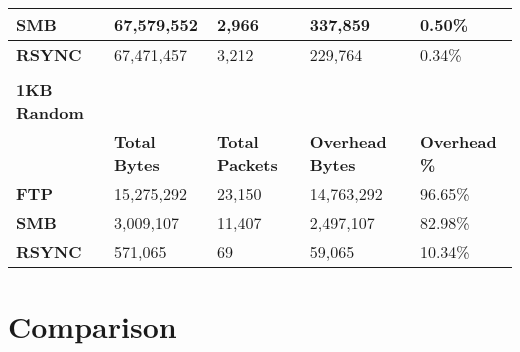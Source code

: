 \begin{table}[h!]
\begin{tabular}{l l l l l}
		\hline
		\textbf{SMB}        & 67,579,552           & 2,966                  & 337,859                 & 0.50\%               \\
		\hline
		\textbf{RSYNC}      & 67,471,457           & 3,212                  & 229,764                 & 0.34\%               \\
		\hline
		                    &                      &                        &                         &                      \\
		\textbf{1KB Random} &                      &                        &                         &                      \\
		\textbf{}           & \textbf{Total Bytes} & \textbf{Total Packets} & \textbf{Overhead Bytes} & \textbf{Overhead \%} \\
		\hline
		\textbf{FTP}        & 15,275,292           & 23,150                 & 14,763,292              & 96.65\%              \\
		\hline
		\textbf{SMB}        & 3,009,107            & 11,407                 & 2,497,107               & 82.98\%              \\
		\hline
		\textbf{RSYNC}      & 571,065              & 69                     & 59,065                  & 10.34\%              \\
		\hline
	\end{tabular}
\end{table}

\section{Comparison}
